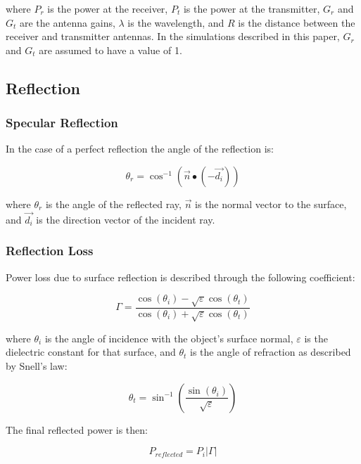 where $P_r $ is the power at the receiver, $P_t$ is the power at the transmitter, $G_r$ and $G_t$ are the antenna gains, 
$\lambda$ is the wavelength, and $R$ is the distance between the receiver and transmitter antennas. In the simulations described in this paper, $G_r$ and $G_t$ are assumed to have a value of 1.

\subsection{Reflection}

\subsubsection{Specular Reflection}
In the case of a perfect reflection the angle of the reflection is:

\begin{equation}
	\theta_r = \cos^{-1}(\vec{n} \bullet (-\vec{d_i}))
	\label{eqn:spec}
\end{equation}

where $\theta_r$ is the angle of the reflected ray, $\vec{n}$ is the normal vector to the surface, and $\vec{d_i}$ is the direction vector of the incident ray.

\subsubsection{Reflection Loss}
Power loss due to surface reflection is described through the following coefficient:

\begin{equation}
	\Gamma = \frac{\cos(\theta_i) - \sqrt{\varepsilon}\cos(\theta_t)}{\cos(\theta_i) + \sqrt{\varepsilon}\cos(\theta_t)}
	\label{eqn:RL}
\end{equation}

where $\theta_i$ is the angle of incidence with the object's surface normal, $\varepsilon$ is the dielectric constant for that surface, and $\theta_t$ is the angle of refraction as described by Snell's law:

\begin{equation}
	\theta_t = \sin^{-1}\left(\frac{\sin(\theta_i)}{\sqrt{\varepsilon}} \right)
	\label{eqn:snell}
\end{equation}

The final reflected power is then:

\begin{equation}
	P_{reflected} = P_i|\Gamma|
	\label{eqn:reflected_power}
\end{equation}

